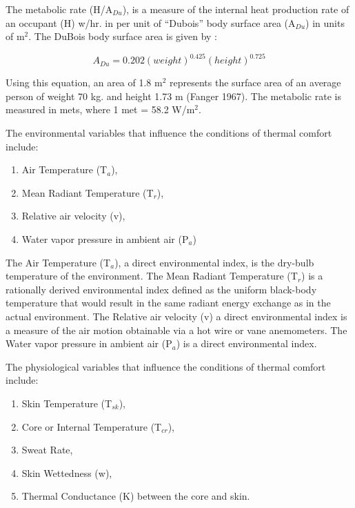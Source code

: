 The metabolic rate (H/A\(_{Du}\)), is a measure of the internal heat production rate of an occupant (H) w/hr. in per unit of ``Dubois'' body surface area (A\(_{Du}\)) in units of m\(^{2}\). The DuBois body surface area is given by :

\begin{equation}
{A_{Du}} = 0.202{(weight)^{0.425}}{(height)^{0.725}}
\end{equation}

Using this equation, an area of 1.8 m\(^{2}\) represents the surface area of an average person of weight 70 kg. and height 1.73 m (Fanger 1967). The metabolic rate is measured in mets, where 1 met = 58.2 W/m\(^{2}\).

The environmental variables that influence the conditions of thermal comfort include:

\begin{enumerate}
\def\labelenumi{(\arabic{enumi})}
\item
  Air Temperature (T\(_{a}\)),
\item
  Mean Radiant Temperature (T\(_{r}\)),
\item
  Relative air velocity (v),
\item
  Water vapor pressure in ambient air (P\(_{a}\))
\end{enumerate}

The Air Temperature (T\(_{a}\)), a direct environmental index, is the dry-bulb temperature of the environment. The Mean Radiant Temperature (T\(_{r}\)) is a rationally derived environmental index defined as the uniform black-body temperature that would result in the same radiant energy exchange as in the actual environment. The Relative air velocity (v) a direct environmental index is a measure of the air motion obtainable via a hot wire or vane anemometers. The Water vapor pressure in ambient air (P\(_{a}\)) is a direct environmental index.

The physiological variables that influence the conditions of thermal comfort include:

\begin{enumerate}
\def\labelenumi{(\arabic{enumi})}
\item
  Skin Temperature (T\(_{sk}\)),
\item
  Core or Internal Temperature (T\(_{cr}\)),
\item
  Sweat Rate,
\item
  Skin Wettedness (w),
\item
  Thermal Conductance (K) between the core and skin.
\end{enumerate}

